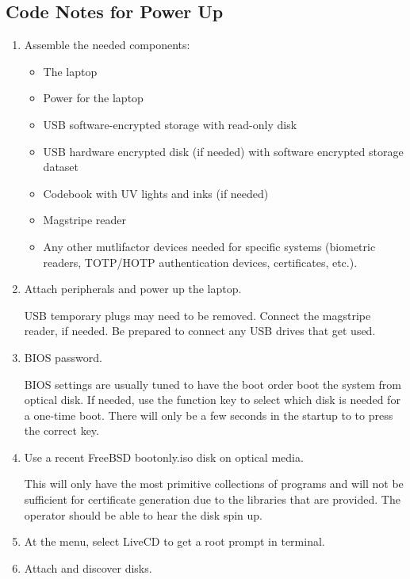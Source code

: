\subsection{Code Notes for Power Up}
\begin{enumerate}
\item Assemble the needed components:
\begin{itemize}
\item The laptop
\item Power for the laptop
\item USB software-encrypted storage with read-only disk
\item USB hardware encrypted disk (if needed) with software encrypted storage \gls{dataset}
\item Codebook with UV lights and inks (if needed)
\item Magstripe reader
\item Any other mutlifactor devices needed for specific systems (biometric readers, TOTP/HOTP \gls{authentication} devices, certificates, etc.).
\end{itemize}

\item Attach peripherals and power up the laptop.

USB temporary plugs may need to be removed.  Connect the magstripe reader, if needed.  Be prepared to connect any USB drives that get used.

\item BIOS \gls{password}.

BIOS settings are usually tuned to have the boot order boot the system from optical disk.  If needed, use the function key to select which disk is needed for a one-time boot.  There will only be a few seconds in the startup to to press the correct key.

\item Use a recent FreeBSD bootonly.iso disk on optical media.

This will only have the most primitive collections of programs and will not be sufficient for \gls{certificate} generation due to the libraries that are provided.  The operator should be able to hear the disk spin up.

\item At the menu, select LiveCD to get a root prompt in terminal.

\item Attach and discover disks.


\end{enumerate}
